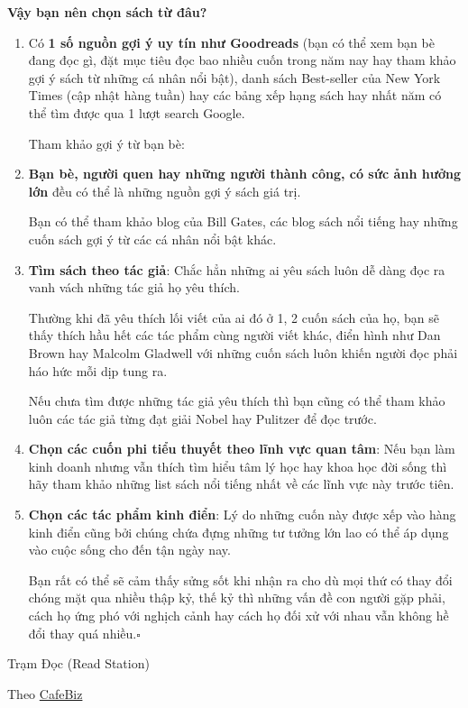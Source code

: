 \documentclass{article}
\begin{document}
\textbf{Vậy bạn nên chọn sách từ đâu?}
\begin{enumerate}
	\item Có \textbf{1 số nguồn gợi ý uy tín như Goodreads} (bạn có thể xem bạn bè đang đọc gì, đặt mục tiêu đọc bao nhiều cuốn trong năm nay hay tham khảo gợi ý sách từ những cá nhân nổi bật), danh sách Best-seller của New York Times (cập nhật hàng tuần) hay các bảng xếp hạng sách hay nhất năm có thể tìm được qua 1 lượt search Google.
	
	Tham khảo gợi ý từ bạn bè:
	\item \textbf{Bạn bè, người quen hay những người thành công, có sức ảnh hưởng lớn} đều có thể là những nguồn gợi ý sách giá trị.
	
	Bạn có thể tham khảo blog của Bill Gates, các blog sách nổi tiếng hay những cuốn sách gợi ý từ các cá nhân nổi bật khác.
	\item \textbf{Tìm sách theo tác giả}: Chắc hẳn những ai yêu sách luôn dễ dàng đọc ra vanh vách những tác giả họ yêu thích.
	
	Thường khi đã yêu thích lối viết của ai đó ở 1, 2 cuốn sách của họ, bạn sẽ thấy thích hầu hết các tác phẩm cùng người viết khác, điển hình như Dan Brown hay Malcolm Gladwell với những cuốn sách luôn khiến người đọc phải háo hức mỗi dịp tung ra.
	
	Nếu chưa tìm được những tác giả yêu thích thì bạn cũng có thể tham khảo luôn các tác giả từng đạt giải Nobel hay Pulitzer để đọc trước.
	\item \textbf{Chọn các cuốn phi tiểu thuyết theo lĩnh vực quan tâm}: Nếu bạn làm kinh doanh nhưng vẫn thích tìm hiểu tâm lý học hay khoa học đời sống thì hãy tham khảo những list sách nổi tiếng nhất về các lĩnh vực này trước tiên.
	\item \textbf{Chọn các tác phẩm kinh điển}: Lý do những cuốn này được xếp vào hàng kinh điển cũng bởi chúng chứa đựng những tư tưởng lớn lao có thể áp dụng vào cuộc sống cho đến tận ngày nay.
	
	Bạn rất có thể sẽ cảm thấy sửng sốt khi nhận ra cho dù mọi thứ có thay đổi chóng mặt qua nhiều thập kỷ, thế kỷ thì những vấn đề con người gặp phải, cách họ ứng phó với nghịch cảnh hay cách họ đối xử với nhau vẫn không hề đổi thay quá nhiều.\hfill$\square$
\end{enumerate}

\begin{flushright}
	Trạm Đọc (Read Station)
	
	Theo \href{http://cafebiz.vn/doc-sach-rat-tot-nhung-lam-sao-de-biet-do-la-mot-cuon-sach-dang-doc-20160820212051793.chn}{CafeBiz}
\end{flushright}
\end{document}
